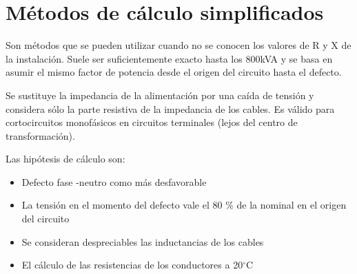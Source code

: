 \section{Métodos de cálculo simplificados}
Son métodos que se pueden utilizar cuando no se conocen los valores de R y X de la instalación. Suele ser suficientemente exacto hasta los 800kVA y se basa en asumir el mismo factor de potencia desde el origen del circuito hasta el defecto.
\newline

Se sustituye la impedancia de la alimentación por una caída de tensión y considera sólo la parte resistiva de la impedancia de los cables. Es válido para cortocircuitos monofásicos en circuitos terminales (lejos del centro de transformación).
\newline

Las hipótesis de cálculo son:
\begin{itemize}
	\item Defecto fase -neutro como más desfavorable
	\item La tensión en el momento del defecto vale el 80 \% de la nominal en el origen del circuito
	\item Se consideran despreciables las inductancias de los cables
	\item El cálculo de las resistencias de los conductores a 20$^\circ$C
\end{itemize}